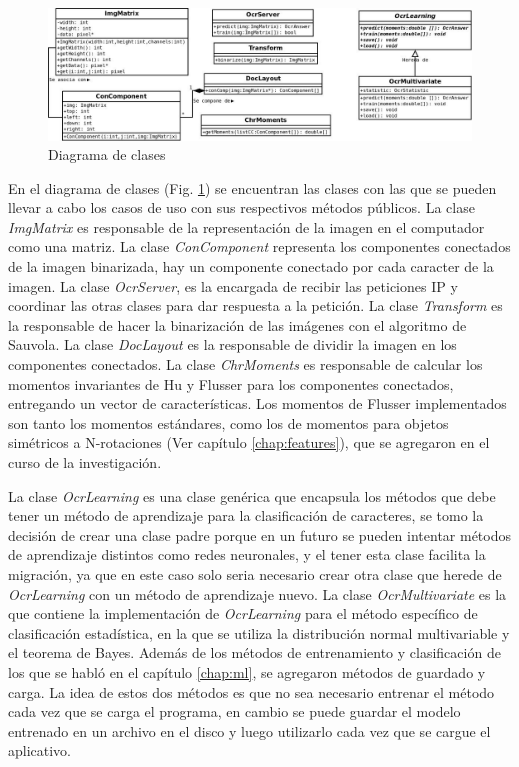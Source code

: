 \documentclass[a4paper, 11pt, oneside]{report}
\begin{document}
\begin{figure}
\begin{center}
\includegraphics[width=20cm]{diagrams/clases.jpg}
\end{center}
\caption{Diagrama de clases}
\label{fig:classes}
\end{figure}

En el diagrama de clases (Fig. \ref{fig:classes}) se encuentran las clases con las que se pueden llevar a cabo los casos de uso con sus respectivos métodos públicos. La clase {\it ImgMatrix} es responsable de la representación de la imagen en el computador como una matriz. La clase {\it ConComponent} representa los componentes conectados de la imagen binarizada, hay un componente conectado por cada caracter de la imagen. La clase {\it OcrServer}, es la encargada de recibir las peticiones IP y coordinar las otras clases para dar respuesta a la petición. La clase {\it Transform} es la responsable de hacer la binarización de las imágenes con el algoritmo de Sauvola. La clase {\it DocLayout} es la responsable de dividir la imagen en los componentes conectados. La clase {\it ChrMoments} es responsable de calcular los momentos invariantes de Hu y Flusser para los componentes conectados, entregando un vector de características. Los momentos de Flusser implementados son tanto los momentos estándares, como los de momentos para objetos simétricos a N-rotaciones (Ver capítulo \ref{chap:features}), que se agregaron en el curso de la investigación.

La clase {\it OcrLearning} es una clase genérica que encapsula los métodos que debe tener un método de aprendizaje para la clasificación de caracteres, se tomo la decisión de crear una clase padre porque en un futuro se pueden intentar métodos de aprendizaje distintos como redes neuronales, y el tener esta clase facilita la migración, ya que en este caso solo seria necesario crear otra clase que herede de {\it OcrLearning} con un método de aprendizaje nuevo. La clase {\it OcrMultivariate} es la que contiene la implementación de {\it OcrLearning} para el método específico de clasificación estadística, en la que se utiliza la distribución normal multivariable y el teorema de Bayes. Además de los métodos de entrenamiento y clasificación de los que se habló en el capítulo \ref{chap:ml}, se agregaron métodos de guardado y carga. La idea de estos dos métodos es que no sea necesario entrenar el método cada vez que se carga el programa, en cambio se puede guardar el modelo entrenado en un archivo en el disco y luego utilizarlo cada vez que se cargue el aplicativo.
\end{document}
